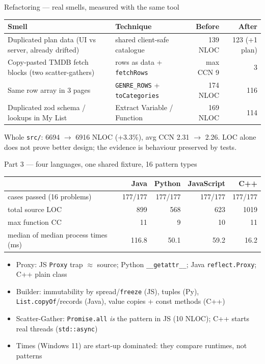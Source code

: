 \documentclass[aspectratio=169,10pt]{beamer}
\begin{document}
\begin{frame}{Refactoring --- real smells, measured with the same tool}
\small
\begin{tabular}{@{}p{5.2cm}p{4.2cm}rr@{}}\toprule
Smell & Technique & Before & After\\\midrule
Duplicated plan data (UI vs server, already drifted) & shared client-safe catalogue & 139 NLOC & 123 (+1 plan)\\
Copy-pasted TMDB fetch blocks (two scatter-gathers) & rows as data + \texttt{fetchRows} & max CCN 9 & 3\\
Same row array in 3 pages & \texttt{GENRE\_ROWS} + \texttt{toCategories} & 174 NLOC & 116\\
Duplicated zod schema / lookups in My List & Extract Variable / Function & 169 NLOC & 114\\\bottomrule
\end{tabular}
\par\medskip
Whole \texttt{src/}: 6694 $\rightarrow$ 6916 NLOC (+3.3\%), avg CCN 2.31 $\rightarrow$ 2.26. LOC alone does not prove better design; the evidence is behaviour preserved by tests.
\end{frame}

\begin{frame}{Part 3 --- four languages, one shared fixture, 16 pattern types}
\small
\begin{tabular}{@{}lrrrr@{}}\toprule
 & Java & Python & JavaScript & C++\\\midrule
cases passed (16 problems) & 177/177 & 177/177 & 177/177 & 177/177\\
total source LOC & 899 & 568 & 623 & 1019\\
max function CC & 11 & 9 & 10 & 11\\
median of median process times (ms) & 116.8 & 50.1 & 59.2 & 16.2\\\bottomrule
\end{tabular}
\par\medskip
\begin{itemize}
\item Proxy: JS \texttt{Proxy} trap $\approx$ source; Python \texttt{\_\_getattr\_\_}; Java \texttt{reflect.Proxy}; C++ plain class
\item Builder: immutability by spread/\texttt{freeze} (JS), tuples (Py), \texttt{List.copyOf}/records (Java), value copies + const methods (C++)
\item Scatter-Gather: \texttt{Promise.all} \emph{is} the pattern in JS (10 NLOC); C++ starts real threads (\texttt{std::async})
\item Times (Windows 11) are start-up dominated: they compare runtimes, not patterns
\end{itemize}
\end{frame}
\end{document}
